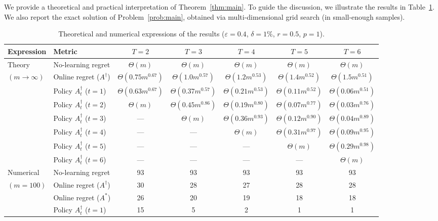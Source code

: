 \documentclass[nonblindrev]{informs3noheader}
\begin{document}
We provide a theoretical and practical interpretation of Theorem~\ref{thm:main}. To guide the discussion, we illustrate the results in Table~\ref{tab:main}. We also report the exact solution of Problem~\eqref{prob:main}, obtained via multi-dimensional grid search (in small-enough samples).

\begin{table}[h!]
\centering
\footnotesize\renewcommand{\arraystretch}{1.0}
\caption{Theoretical and numerical expressions of the results ($\varepsilon=0.4$, $\delta=1\%$, $r=0.5$, $p=1$).}
\label{tab:main}
\begin{tabular}{llccccc}
\toprule
Expression	&	Metric			&	$T=2$						&	$T=3$						&	$T=4	$						&	$T=5$						&	$T=6$						\\
\hline
Theory		&	No-learning regret	&	$\Theta(m)$			&	$\Theta(m)$			&	$\Theta(m)$			&	$\Theta(m)$			&	$\Theta(m)$			\\
$(m\to\infty)$	&	Online regret ($A^\dagger$)		&	$\Theta(0.75m^{0.67})$	&	$\Theta(1.0m^{0.57})$	&	$\Theta(1.2m^{0.53})$	&	$\Theta(1.4m^{0.52})$	&	$\Theta(1.5m^{0.51})$	\\
\cmidrule{2-7}
			&	Policy $A^\dagger_t$ ($t=1$)	&	$\Theta(0.63 m^{0.67})$	&	$\Theta(0.37 m^{0.57})$	&	$\Theta(0.21 m^{0.53})$	&	$\Theta(0.11 m^{0.52})$	&	$\Theta(0.06 m^{0.51})$	\\
			&	Policy $A^\dagger_t$ ($t=2$)	&	$\Theta(m)$					&	$\Theta(0.45 m^{0.86})$	&	$\Theta(0.19 m^{0.80})$	&	$\Theta(0.07 m^{0.77})$	&	$\Theta(0.03 m^{0.76})$	\\
			&	Policy $A^\dagger_t$ ($t=3$)	&	---							&	$\Theta(m)$					&	$\Theta(0.36 m^{0.93})$	&	$\Theta(0.12 m^{0.90})$	&	$\Theta(0.04 m^{0.89})$	\\
			&	Policy $A^\dagger_t$ ($t=4$)	&	---							&	---							&	$\Theta(m)$					&	$\Theta(0.31 m^{0.97})$	&	$\Theta(0.09 m^{0.95})$	\\
			&	Policy $A^\dagger_t$ ($t=5$)	&	---							&	---							&	---							&	$\Theta(m)$					&	$\Theta(0.29 m^{0.98})$	\\
			&	Policy $A^\dagger_t$ ($t=6$)	&	---							&	---							&	---							&	---							&	$\Theta(m)$					\\
\hline
Numerical	&	No-learning regret	&	93		&	93		&	93		&	93		&	93		\\
$(m=100)$	&	Online regret ($A^\dagger$)		&	30		&	28		&	27		&	28		&	28		\\
	        &	Online regret ($A^*$)		&	26		&	20		&	19		&	18		&	18		\\
\cmidrule{2-7}
			&	Policy $A^\dagger_t$ ($t=1$)	&	15		&	5		&	2		&	1		&	1		\\

\end{tabular}
\end{table}
\end{document}
